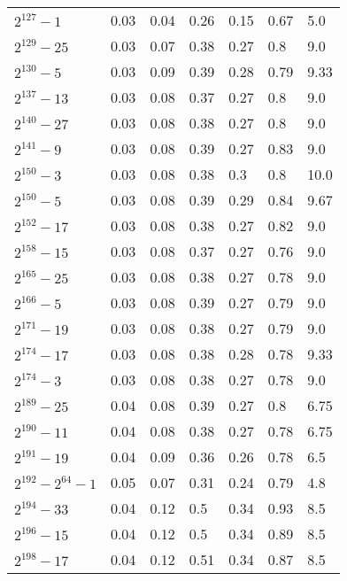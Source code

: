 \documentclass[conference,letterpaper]{IEEEtran}
\begin{document}
\footnotesize
\centering
\begin{xtabular}{|l|p{0.475cm}|p{0.75cm}@{}|p{0.7cm}@{}|p{0.6cm}@{}|p{0.6cm}@{}|p{0.75cm}@{}|@{}}
	$2^{127}-1$ & 0.03 & 0.04 & 0.26 & 0.15 & 0.67 & 5.0 \\
	$2^{129}-25$ & 0.03 & 0.07 & 0.38 & 0.27 & 0.8 & 9.0 \\
	$2^{130}-5$ & 0.03 & 0.09 & 0.39 & 0.28 & 0.79 & 9.33 \\
	$2^{137}-13$ & 0.03 & 0.08 & 0.37 & 0.27 & 0.8 & 9.0 \\
	$2^{140}-27$ & 0.03 & 0.08 & 0.38 & 0.27 & 0.8 & 9.0 \\
	$2^{141}-9$ & 0.03 & 0.08 & 0.39 & 0.27 & 0.83 & 9.0 \\
	$2^{150}-3$ & 0.03 & 0.08 & 0.38 & 0.3 & 0.8 & 10.0 \\
	$2^{150}-5$ & 0.03 & 0.08 & 0.39 & 0.29 & 0.84 & 9.67 \\
	$2^{152}-17$ & 0.03 & 0.08 & 0.38 & 0.27 & 0.82 & 9.0 \\
	$2^{158}-15$ & 0.03 & 0.08 & 0.37 & 0.27 & 0.76 & 9.0 \\
	$2^{165}-25$ & 0.03 & 0.08 & 0.38 & 0.27 & 0.78 & 9.0 \\
	$2^{166}-5$ & 0.03 & 0.08 & 0.39 & 0.27 & 0.79 & 9.0 \\
	$2^{171}-19$ & 0.03 & 0.08 & 0.38 & 0.27 & 0.79 & 9.0 \\
	$2^{174}-17$ & 0.03 & 0.08 & 0.38 & 0.28 & 0.78 & 9.33 \\
	$2^{174}-3$ & 0.03 & 0.08 & 0.38 & 0.27 & 0.78 & 9.0 \\
	$2^{189}-25$ & 0.04 & 0.08 & 0.39 & 0.27 & 0.8 & 6.75 \\
	$2^{190}-11$ & 0.04 & 0.08 & 0.38 & 0.27 & 0.78 & 6.75 \\
	$2^{191}-19$ & 0.04 & 0.09 & 0.36 & 0.26 & 0.78 & 6.5 \\
	$2^{192}-2^{64}-1$ & 0.05 & 0.07 & 0.31 & 0.24 & 0.79 & 4.8 \\
	$2^{194}-33$ & 0.04 & 0.12 & 0.5 & 0.34 & 0.93 & 8.5 \\
	$2^{196}-15$ & 0.04 & 0.12 & 0.5 & 0.34 & 0.89 & 8.5 \\
	$2^{198}-17$ & 0.04 & 0.12 & 0.51 & 0.34 & 0.87 & 8.5 \\

\end{xtabular}
\end{document}
